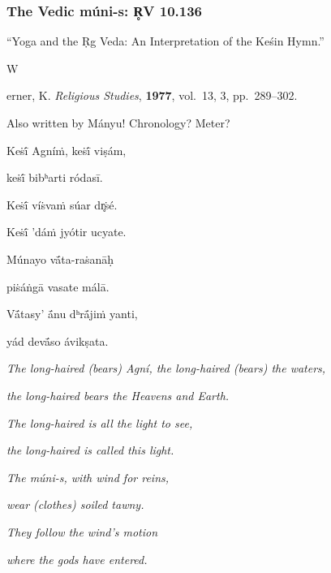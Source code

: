 \documentclass[pdf]{beamer}
\newcommand{\Subitem}[1]{{\setlength\itemindent{12pt} \item[-] #1}}
\begin{document}
\begin{frame} \frametitle{The Vedic múni-s: R̥V 10.136}
\begin{itemize}
	\item ``Yoga and the Ṛg Veda: An Interpretation of the Keśin Hymn.''
	\Subitem Werner, K. \emph{Religious Studies}, \textbf{1977}, vol.~13, 3, pp.~289--302.
	\item Also written by Mányu! Chronology? Meter?
\end{itemize}
\pause
\begin{center}
\begin{multicols}{2}
\scriptsize{
	Keṡī́ Agníṁ, keṡī́ viṣám,

	\vspace{\baselineskip}

	keṡī́ bibʰarti ródasī.

	Keṡī́ víṡvaṁ súar dr̥ṡé.

	Keṡī́ 'dáṁ jyótir ucyate.

	\vspace{\baselineskip}

	Múnayo vā́ta-raṡanāḥ

	piṡáṅgā vasate málā.

	Vā́tasy' ā́nu dʰrā́jiṁ yanti,

	yád devā́so ávikṣata.

	\columnbreak

	\textit{The long-haired (bears) Agní, the long-haired (bears) the waters,}

	\textit{the long-haired bears the Heavens and Earth.}

	\textit{The long-haired is all the light to see,}

	\textit{the long-haired is called this light.}

	\vspace{\baselineskip}

	\textit{The múni-s, with wind for reins,}

	\textit{wear (clothes) soiled tawny.}

	\textit{They follow the wind's motion}

	\textit{where the gods have entered.}
}
\end{multicols}
\end{center}
\end{frame}
\end{document}

